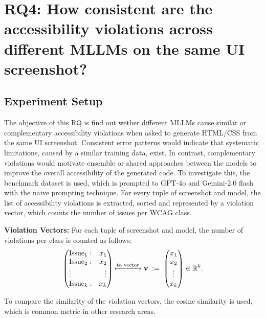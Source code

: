 \section{RQ4: How consistent are the accessibility violations across different MLLMs on the same UI screenshot?}
\subsection{Experiment Setup}
The objective of this RQ is find out wether different MLLMs 
cause similar or complementary accessibility violations when 
asked to generate HTML/CSS from the same UI screenshot.
Consistent error patterns would indicate that systematic 
limitations, caused by a similar training data, exist. 
In contrast, complementary violations would motivate 
ensemble or shared approaches between the models to improve the 
overall accessibility of the generated code.
To investigate this, the benchmark dataset is used, which 
is prompted to GPT-4o and Gemini-2.0 flash with 
the naive prompting technique. For every tuple of
screenshot and model, the list of accessibility violations
is extracted, sorted and represented by a violation 
vector, which counts the number of issues per 
WCAG class. 



\newcommand{\vect}[1]{\begin{pmatrix}#1\end{pmatrix}}
\newcommand{\issues}{k}                   %
\newcommand{\vx}{\mathbf x}
\newcommand{\vy}{\mathbf y}

\textbf{Violation Vectors:}  
  For each tuple of screenshot and model, the number of violations per class is counted as follows:
  \[
  \left(
    \begin{array}{@{}l r@{}}
      \text{Issue}_{1}: & x_{1}\\
      \text{Issue}_{2}: & x_{2}\\
      \vdots           & \vdots\\
      \text{Issue}_{\issues}: & x_{\issues}
    \end{array}
  \right)
  \xmapsto{\text{to vector}}
  \mathbf v \;:=\;
  \vect{x_{1}\\x_{2}\\\vdots\\x_{\issues}} \in \mathbb R^{\issues}.
\]

To compare the similarity of the violation vectors, the 
cosine similarity is used, which is common metric in 
other research areas. 

